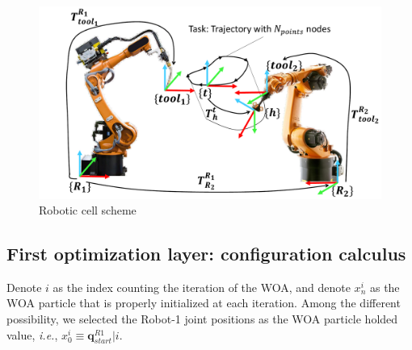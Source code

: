 \documentclass[twocolumn]{svjour3}
\newcommand{\R}[1]{R#1}
\newcommand{\RA}{\R{1}}
\newcommand{\qrA}{\mathbf{q}^{\RA}}
\newcommand{\qrAz}[1]{\qrA_{#1}}
\begin{document}



\begin{figure}[b]
	\centering
	\includegraphics[width=0.99\columnwidth]{Robot_cell3}
	\caption{Robotic cell scheme}
	\label{fig:robot_cell}
\end{figure}
 
\subsection{First optimization layer: configuration calculus}
\label{WACO_optim}

Denote $i$ as the index counting the iteration of the WOA, and denote $x_n^i$ as the WOA particle that is properly initialized at each iteration.
Among the different possibility, we selected the Robot-1 joint positions as the WOA particle holded value, \textit{i.e.}, $x^i_0\equiv\qrAz{start}|i$.
\end{document}
